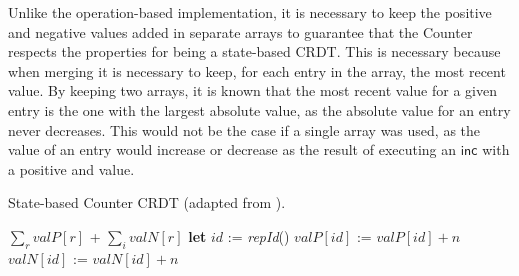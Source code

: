 \documentclass[11pt,a4paper]{article}
\newcommand{\Let}{\textbf{let} }
\begin{document}
Unlike the operation-based implementation, it is necessary to keep the positive 
and negative values added in separate arrays to guarantee that the Counter respects the
properties for being a state-based CRDT.
This is necessary because when merging it is necessary to keep, for each entry
in the array, the most recent value. 
By keeping two arrays, it is known that the most recent value for a given entry is
the one with the largest absolute value, as the absolute value for an entry never 
decreases.
This would not be the case if a single array was used, as the value of an entry would
increase or decrease as the result of executing an $\textsf{inc}$ with a positive and 
value.

\begin{algorithm}
\caption{State-based Counter CRDT (adapted from \cite{Shapiro11Comprehensive}).}
\label{alg:st:counter}
\begin{algorithmic}[1]
 
\EndPayload
{}
\State \Return $\sum_r \mathit{valP}[r]$ + $\sum_i \mathit{valN}[r]$
\EndQuery
{}
    \State \Let $\mathit{id}$ := \emph{repId}() 
    \State $\mathit{valP}[\mathit{id}]$ := $\mathit{valP}[\mathit{id}] + n$
    \Else
    \State $\mathit{valN}[\mathit{id}]$ := $\mathit{valN}[\mathit{id}] + n$
    \EndIf
\EndUpdate
{}
    \EndFor
\EndMerge
\end{algorithmic}
\end{algorithm}

\end{document}
